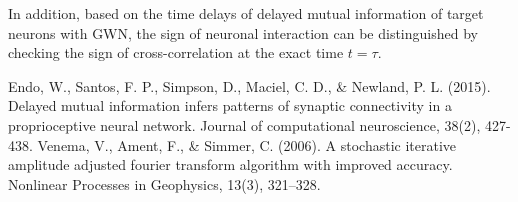 \documentclass{article}[12pt]
\begin{document}
In addition, based on the time delays of delayed mutual information of target neurons with GWN, the sign of neuronal interaction can be distinguished by checking the sign of cross-correlation at the exact time $t=\tau$.

\begin{thebibliography}{0}
	Endo, W., Santos, F. P., Simpson, D., Maciel, C. D., \& Newland, P. L. (2015). Delayed mutual information infers patterns of synaptic connectivity in a proprioceptive neural network. Journal of computational neuroscience, 38(2), 427-438.
	Venema, V., Ament, F., \& Simmer, C. (2006). A stochastic iterative amplitude adjusted fourier transform algorithm with improved accuracy. Nonlinear Processes in Geophysics, 13(3), 321–328.
\end{thebibliography}
\end{document}
